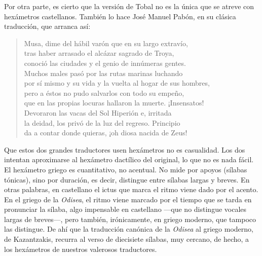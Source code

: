 \documentclass[11pt,a4paper]{article}
\begin{document}
Por otra parte, es cierto que la versión de Tobal no es la única que se atreve con hexámetros castellanos. También lo hace José Manuel Pabón, en su clásica traducción, que arranca así:


\begin{verse}
Musa, dime del hábil varón que en su largo extravío,\\
tras haber arrasado el alcázar sagrado de Troya,\\
conoció las ciudades y el genio de innúmeras gentes.\\
Muchos males pasó por las rutas marinas luchando\\
por sí mismo y su vida y la vuelta al hogar de sus hombres,\\
pero a éstos no pudo salvarlos con todo su empeño,\\
que en las propias locuras hallaron la muerte. ¡Insensatos!\\
Devoraron las vacas del Sol Hiperión e, irritada\\
la deidad, los privó de la luz del regreso. Principio\\
da a contar donde quieras, ¡oh diosa nacida de Zeus!
\end{verse}

Que estos dos grandes traductores usen hexámetros no es casualidad. Los dos intentan aproximarse al hexámetro dactílico del original, lo que no es nada fácil. El hexámetro griego es cuantitativo, no acentual. No mide por apoyos (sílabas tónicas), sino por duración, es decir, distingue entre sílabas largas y breves. En otras palabras, en castellano el ictus que marca el ritmo viene dado por el acento. En el griego de la \emph{Odisea}, el ritmo viene marcado por el tiempo que se tarda en pronunciar la sílaba, algo impensable en castellano ---que no distingue vocales largas de breves---, pero también, irónicamente, en griego moderno, que tampoco las distingue. De ahí que la traducción canónica de la \emph{Odisea} al griego moderno, de Kazantzakis, recurra al verso de diecisiete sílabas, muy cercano, de hecho, a los hexámetros de nuestros valerosos traductores.
\end{document}
